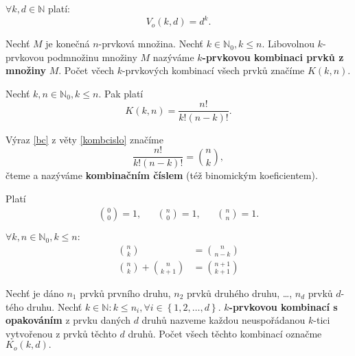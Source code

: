 \begin{veta}
    $\forall k, d \in \mathbb N$ platí:
    $$V_o(k,d)=d^k.$$
\end{veta}

\begin{definition}
    Nechť $M$ je konečná $n$-prvková množina. Nechť $k \in \mathbb N_0, k\leq n.$
    Libovolnou $k$-prvkovou podmnožinu množiny $M$ nazýváme \textbf{$k$-prvkovou
    kombinaci prvků z množiny} $M$. Počet včech $k$-prvkových kombinací všech
    prvků značíme $K(k,n).$
\end{definition}

\begin{veta}\label{kombcislo}
    Nechť $k,n \in \mathbb N_0, k\leq n.$ Pak platí
    \begin{equation}\label{bc}
   K(k,n)=\frac{n!}{k!(n-k)!}.
    \end{equation}

\end{veta}

\begin{definition}
    Výraz \ref{bc} z věty \ref{kombcislo} značíme
    $$\frac{n!}{k!(n-k)!}=\binom{n}{k},$$
    čteme  a nazýváme \textbf{kombinačním číslem} (též binomickým
    koeficientem).
\end{definition}

\begin{pozn}
    Platí
    \begin{align*}
        \binom{0}{0}=1, & & \binom{n}{0}=1, & & \binom{n}{n} = 1.
    \end{align*}
\end{pozn}

\begin{veta}\label{binomvztahy}
    $\forall k,n \in \mathbb N_0, k\leq n:$
    \begin{align*}
        \binom{n}{k} &= \binom{n}{n-k} \\
        \binom{n}{k} + \binom{n}{k+1} &= \binom{n+1}{k+1}
    \end{align*}
\end{veta}

\begin{definition}
    Nechť je dáno $n_1$ prvků prvního druhu, $n_2$ prvků druhého druhu, \dots,
    $n_d$ prvků $d$-tého druhu. Nechť $k\in \mathbb N: k\leq n_i, \forall i
    \in \left \{ 1,2,\dots,d \right \} .$ \textbf{$k$-prvkovou kombinací s opakováním}
    z prvku daných $d$ druhů nazveme každou neuspořádanou $k$-tici vytvořenou z
    prvků těchto $d$ druhů. Počet všech těchto kombinací označme $K_o(k,d).$
\end{definition}

